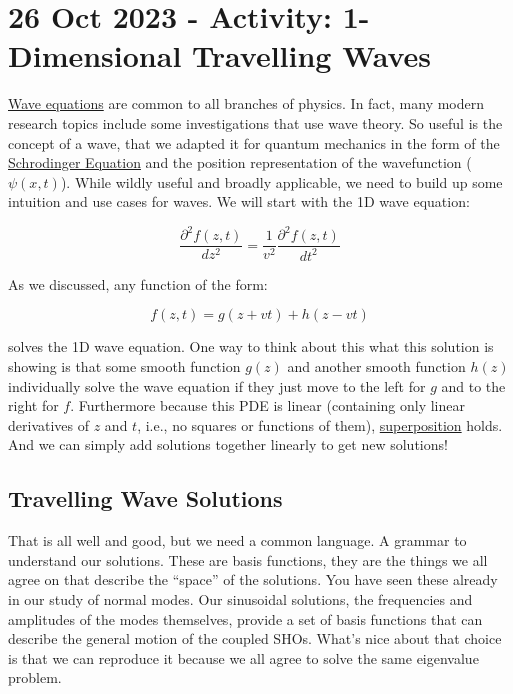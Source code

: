 \section{26 Oct 2023 - Activity: 1-Dimensional Travelling
Waves}\label{oct-2023---activity-1-dimensional-travelling-waves}

\href{https://en.wikipedia.org/wiki/Wave_equation}{Wave equations} are
common to all branches of physics. In fact, many modern research topics
include some investigations that use wave theory. So useful is the
concept of a wave, that we adapted it for quantum mechanics in the form
of the
\href{https://en.wikipedia.org/wiki/Schr\%C3\%B6dinger_equation}{Schrodinger
Equation} and the position representation of the wavefunction
(\(\psi(x,t)\)). While wildly useful and broadly applicable, we need to
build up some intuition and use cases for waves. We will start with the
1D wave equation:

\[\dfrac{\partial^2 f(z,t)}{dz^2} = \dfrac{1}{v^2}\dfrac{\partial^2 f(z,t)}{dt^2}\]

As we discussed, any function of the form:

\[f(z,t) = g(z+vt)+h(z-vt)\]

solves the 1D wave equation. One way to think about this what this
solution is showing is that some smooth function \(g(z)\) and another
smooth function \(h(z)\) individually solve the wave equation if they
just move to the left for \(g\) and to the right for \(f\). Furthermore
because this PDE is linear (containing only linear derivatives of \(z\)
and \(t\), i.e., no squares or functions of them),
\href{https://en.wikipedia.org/wiki/Superposition_principle}{superposition}
holds. And we can simply add solutions together linearly to get new
solutions!

\subsection{Travelling Wave Solutions}\label{travelling-wave-solutions}

That is all well and good, but we need a common language. A grammar to
understand our solutions. These are basis functions, they are the things
we all agree on that describe the ``space'' of the solutions. You have
seen these already in our study of normal modes. Our sinusoidal
solutions, the frequencies and amplitudes of the modes themselves,
provide a set of basis functions that can describe the general motion of
the coupled SHOs. What's nice about that choice is that we can reproduce
it because we all agree to solve the same eigenvalue problem.

